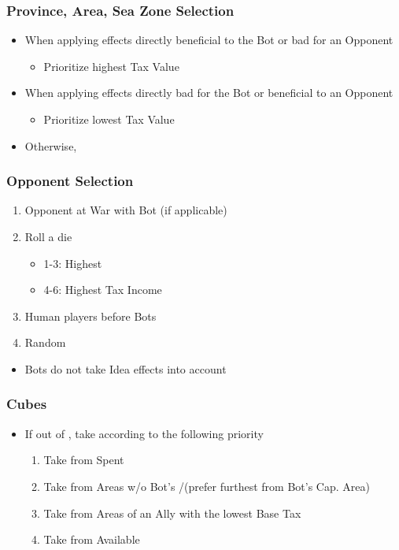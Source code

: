 \documentclass[10pt]{article}
\begin{document}
\subsubsection*{Province, Area, Sea Zone Selection}
\begin{itemize}
	\item When applying effects directly beneficial to the Bot or bad for an Opponent
	\begin{itemize}
		\item Prioritize highest Tax Value
	\end{itemize}
	\item When applying effects directly bad for the Bot or beneficial to an Opponent
	\begin{itemize}
		\item Prioritize lowest Tax Value
	\end{itemize}
	\item Otherwise, \az
\end{itemize}

\subsubsection*{Opponent Selection}
\begin{enumerate}
	\item Opponent at War with Bot (if applicable)
	\item Roll a die
	\begin{itemize}
		\item 1-3: Highest \prestige
		\item 4-6: Highest Tax Income
	\end{itemize}
	\item Human players before Bots
	\item Random	
\end{enumerate}

\begin{itemize}
	\item Bots do not take Idea effects into account
\end{itemize}

\subsubsection*{Cubes}
\begin{itemize}
	\item If out of \cubes, take according to the following priority
	\begin{enumerate}
		\item Take \cubes from Spent \botpower
		\item Take \influence from Areas w/o Bot's \alliance/\marriage (prefer furthest from Bot's Cap. Area)
		\item Take from Areas of an Ally with the lowest Base Tax
		\item Take from Available \botpower
	\end{enumerate}
\end{itemize}
\end{document}
